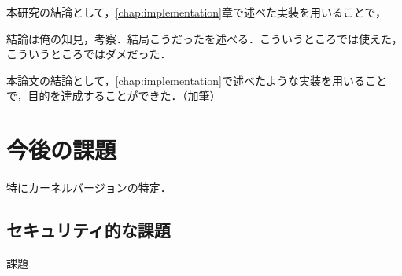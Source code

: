 本研究の結論として，\ref{chap:implementation}章で述べた実装を用いることで，

結論は俺の知見，考察．結局こうだったを述べる．こういうところでは使えた，こういうところではダメだった．

本論文の結論として，\ref{chap:implementation}で述べたような実装を用いることで，目的を達成することができた．（加筆）

\section{今後の課題}

特にカーネルバージョンの特定．

\subsection{セキュリティ的な課題}

課題
